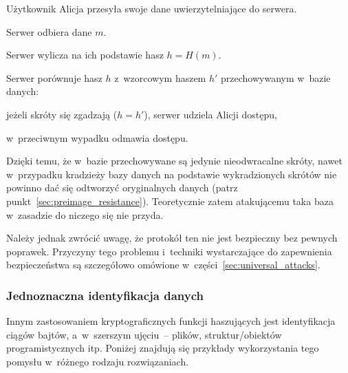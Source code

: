 \label{sec:secure_pasword_storage}%
\begin{myenumerate}

    \item Użytkownik Alicja przesyła swoje dane uwierzytelniające do serwera.

    \item Serwer odbiera dane $m$.

    \item Serwer wylicza na ich podstawie hasz $h = H(m)$.

    \item Serwer porównuje hasz $h$ z~wzorcowym haszem $h'$ przechowywanym
    w~bazie danych:

    \begin{myenumerate}

        \item jeżeli skróty się zgadzają ($h = h'$), serwer udziela Alicji
        dostępu,

        \item w~przeciwnym wypadku odmawia dostępu.

    \end{myenumerate}

\end{myenumerate}

Dzięki temu, że w~bazie przechowywane są jedynie nieodwracalne skróty, nawet
w~przypadku kradzieży bazy danych na podstawie wykradzionych skrótów nie
powinno dać się odtworzyć oryginalnych danych (patrz
punkt~\ref{sec:preimage_resistance}). Teoretycznie zatem atakującemu taka baza
w~zasadzie do niczego się nie przyda.

Należy jednak zwrócić uwagę, że protokół ten nie jest bezpieczny bez pewnych
poprawek. Przyczyny tego problemu i~techniki wystarczające do zapewnienia
bezpieczeństwa są szczegółowo omówione w~części~\ref{sec:universal_attacks}.



\subsubsection{Jednoznaczna identyfikacja danych}
Innym zastosowaniem kryptograficznych funkcji haszujących jest identyfikacja
ciągów bajtów, a~w~szerszym ujęciu~-- plików, struktur/obiektów
programistycznych itp. Poniżej znajdują się przykłady wykorzystania tego
pomysłu w~różnego rodzaju rozwiązaniach.

